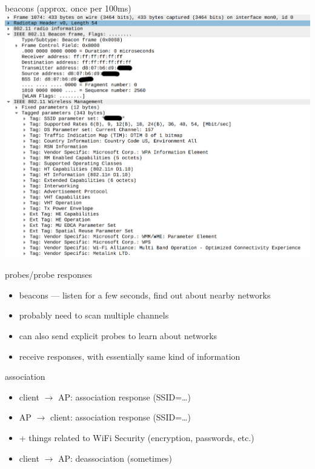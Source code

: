 \begin{frame}{beacons (approx. once per 100ms)}
\includegraphics[height=0.85\textheight]{../multiaccess/wifi-beacon-1.png}
\end{frame}

\begin{frame}{probes/probe responses}
    \begin{itemize}
    \item beacons --- listen for a few seconds, find out about nearby networks
    \item probably need to scan multiple channels
    \vspace{.5cm}
    \item can also send explicit probes to learn about networks
    \item receive responses, with essentially same kind of information
    \end{itemize}
\end{frame}

\begin{frame}{association}
    \begin{itemize}
    \item client $\rightarrow$ AP: association response (SSID=\ldots)
    \item AP $\rightarrow$ client: association response (SSID=\ldots)
    \item + things related to WiFi Security (encryption, passwords, etc.)
    \vspace{.5cm}
    \item client $\rightarrow$ AP: deassociation (sometimes)
    \end{itemize}
\end{frame}

